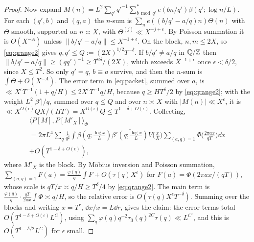 \documentclass[11pt,colorlinks]{charlie}
\newcommand{\ip}[2]{\langle #1,#2\rangle}
\begin{document}
\begin{proof}
Now expand $M(n)=L^2\sum_{q'}q'^{-1}\sum_{b\bmod q'}^*e(bn/q')\beta(q';\log n/L)$. For each $(q',b)$ and $(q,a)$ the $n$-sum is $\sum_ne((b/q'-a/q)n)\Theta(n)$ with $\Theta$ smooth, supported on $n\asymp X$, with $\Theta^{(j)}\ll X^{-j+\epsilon}$. By Poisson summation it is $O(X^{-A})$ unless $\|b/q'-a/q\|\le X^{-1+\epsilon}$. On the block, $n,m\le2X$, so \eqref{eq:qrange2} gives $q,q'\le Q:=(2X)^{1/2}T^{-\delta}$. If $b/q'\ne a/q$ in $\mathbb{Q}/\mathbb{Z}$ then $\|b/q'-a/q\|\ge(qq')^{-1}\ge T^{2\delta}/(2X)$, which exceeds $X^{-1+\epsilon}$ once $\epsilon<\delta/2$, since $X\le T^2$. So only $q'=q$, $b\equiv a$ survive, and then the $n$-sum is $\int\Theta+O(X^{-A})$. The error term in \eqref{eq:packet}, summed over $a$, is $\ll X^\epsilon T^{-1}(1+q/H)\le2X^\epsilon T^{-1}q/H$, because $q\ge HT^{\delta}/2$ by \eqref{eq:qrange2}; with the weight $L^2|\beta'|/q$, summed over $q\le Q$ and over $n\asymp X$ with $|M(n)|\ll X^\epsilon$, it is $\ll X^{O(\epsilon)}QX/(HT)=X^{O(\epsilon)}Q\le T^{1-\delta+O(\epsilon)}$. Collecting,
\begin{multline*}
 \ip{P[M]}{P[M'_X]}_\Phi\\
 =2\pi L^4\sum_q\frac1{q^2}\int\beta(q;\tfrac{\log x}L)\overline{\beta'(q;\tfrac{\log x}L)}V\Big(\frac xX\Big)\sum_{(a,q)=1}\Phi\Big(\frac{2\pi ax}{qT}\Big)\dd x\\
 +O(T^{1-\delta+O(\epsilon)}),
\end{multline*}
where $M'_X$ is the block. By M\"obius inversion and Poisson summation, $\sum_{(a,q)=1}F(a)=\frac{\varphi(q)}q\int F+O(\tau(q)X^\epsilon)$ for $F(a)=\Phi(2\pi ax/(qT))$, whose scale is $qT/x\asymp q/H\ge T^{\delta}/4$ by \eqref{eq:qrange2}. The main term is $\frac{\varphi(q)}q\cdot\frac{qT}{2\pi x}\int\Phi\asymp q/H$, so the relative error is $O(\tau(q)X^{\epsilon}T^{-\delta})$. Summing over the blocks and writing $x=T^r$, $\dd x/x=L\dd r$, gives the claim: the error terms total $O(T^{1-\delta+O(\epsilon)}L^{C})$, using $\sum_q\varphi(q)q^{-2}\tau_3(q)^{2C}\tau(q)\ll L^{C'}$, and this is $O(T^{1-\delta/2}L^C)$ for $\epsilon$ small.


\end{proof}
\end{document}
